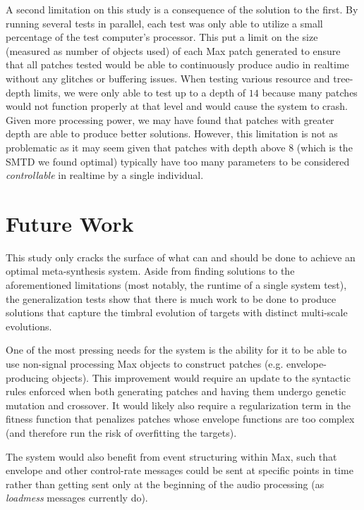 \documentclass[12pt]{report} 	%
\numberwithin{figure}{chapter}
\numberwithin{table}{chapter}
\numberwithin{equation}{chapter}
\begin{document}
\begin{flushleft}
A second limitation on this study is a consequence of the solution to the first. By running several tests in parallel, each test was only able to utilize a small percentage of the test computer's processor. This put a limit on the size (measured as number of objects used) of each Max patch generated to ensure that all patches tested would be able to continuously produce audio in realtime without any glitches or buffering issues. When testing various resource and tree-depth limits, we were only able to test up to a depth of $14$ because many patches would not function properly at that level and would cause the system to crash. Given more processing power, we may have found that patches with greater depth are able to produce better solutions. However, this limitation is not as problematic as it may seem given that patches with depth above $8$ (which is the SMTD we found optimal) typically have too many parameters to be considered \textit{controllable} in realtime by a single individual.

\vspace{12pt}\section{Future Work}
This study only cracks the surface of what can and should be done to achieve an optimal meta-synthesis system. Aside from finding solutions to the aforementioned limitations (most notably, the runtime of a single system test), the generalization tests show that there is much work to be done to produce solutions that capture the timbral evolution of targets with distinct multi-scale evolutions.

One of the most pressing needs for the system is the ability for it to be able to use non-signal processing Max objects to construct patches (e.g. envelope-producing objects). This improvement would require an update to the syntactic rules enforced when both generating patches and having them undergo genetic mutation and crossover. It would likely also require a regularization term in the fitness function that penalizes patches whose envelope functions are too complex (and therefore run the risk of overfitting the targets). 

The system would also benefit from event structuring within Max, such that envelope and other control-rate messages could be sent at specific points in time rather than getting sent only at the beginning of the audio processing (as \textit{loadmess} messages currently do).


\end{flushleft}
\end{document}
